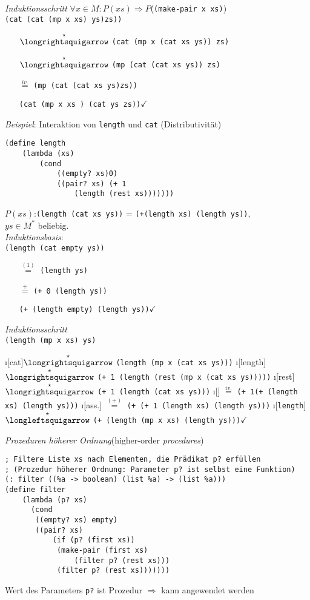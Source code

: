 \emph{Induktionsschritt} $\forall x \in M: P(xs) \Rightarrow P$(\lstinline|(make-pair x xs)|)\\
\lstinline|(cat (cat (mp x xs) ys)zs))|
\begin{enumerate}
\item[$\overset{\star}{\text{\eval}}$] \lstinline|(cat (mp x (cat xs ys)) zs)|
\item[$\overset{\star}{\text{\eval}}$]
\lstinline|(mp (cat (cat xs ys)) zs)|
\item[$\overset{iv.}{=}$] \lstinline|(mp (cat (cat xs ys)zs))|
\item[\reval] \lstinline|(cat (mp x xs ) (cat ys zs))|$\checkmark$
\end{enumerate}
\bigskip
\emph{Beispiel}: Interaktion von \lstinline|length| und \lstinline|cat| (Distributivität)
\begin{lstlisting}
(define length
	(lambda (xs)
		(cond
			((empty? xs)0)
			((pair? xs) (+ 1 
				(length (rest xs)))))))
\end{lstlisting}
$P(xs)$:\lstinline|(length (cat xs ys))| = \lstinline|(+(length xs) (length ys))|,\\
 $ys \in M^*$ beliebig.\\
\emph{Induktionsbasis}:\\
\lstinline|(length (cat empty ys))|
\begin{enumerate}
	\item[$\overset{(1)}{=}$] \lstinline|(length ys)|
	\item[$\overset{+}{=}$] \lstinline|(+ 0 (length ys))|
	\item[\reval] \lstinline|(+ (length empty) (length ys))|$\checkmark$
\end{enumerate}
\emph{Induktionsschritt}\\
\lstinline|(length (mp x xs) ys)|
\begin{enumerate}
	\i[cat]$\overset{\star}{\text{\eval}}$ \lstinline|(length (mp x (cat xs ys)))|
	\i[length]$\overset{\star}{\text{\eval}}$ \lstinline|(+ 1 (length (rest (mp x (cat xs ys)))))|
	\i[rest]$\overset{\star}{\text{\eval}}$ \lstinline|(+ 1 (length (cat xs ys)))|
	\i[] $\overset{iv.}{=}$ \lstinline|(+ 1(+ (length xs) (length ys)))|
	\i[ass.] $\overset{(+)}{=}$ \lstinline|(+ (+ 1 (length xs) (length ys)))|
	\i[\lstinline|length|]$\overset{\star}{\text{\reval}}$ \lstinline|(+ (length (mp x xs) (length ys)))|$\checkmark$
\end{enumerate}
\newpage
\emph{Prozeduren höherer Ordnung}\hfill(higher-order \emph{procedures})
\begin{lstlisting}
; Filtere Liste xs nach Elementen, die Prädikat p? erfüllen
; (Prozedur höherer Ordnung: Parameter p? ist selbst eine Funktion)
(: filter ((%a -> boolean) (list %a) -> (list %a)))
(define filter
	(lambda (p? xs)
	  (cond 
	   ((empty? xs) empty)
	   ((pair? xs)  
		   (if (p? (first xs))
			(make-pair (first xs)
				(filter p? (rest xs)))  
			(filter p? (rest xs)))))))
\end{lstlisting}
Wert des Parameters \lstinline|p?| ist Prozedur $\Rightarrow$ kann angewendet werden